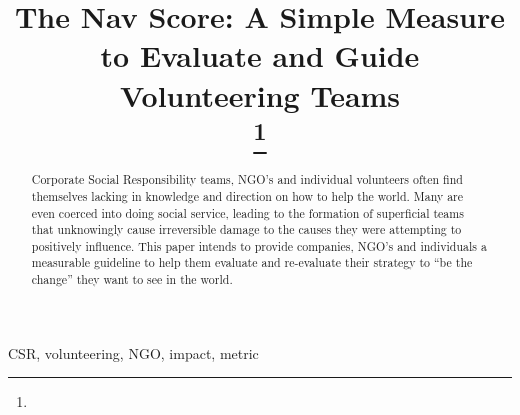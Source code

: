 \documentclass[conference]{IEEEtran}
\begin{document}
\title{The Nav Score: A Simple Measure to Evaluate and Guide Volunteering Teams\\
{\footnotesize }
\thanks{}
}

\author{
}

\maketitle

\begin{abstract}
Corporate Social Responsibility teams, NGO's and individual volunteers often find themselves lacking in knowledge and direction on how to help the world. Many are even coerced into doing social service, leading to the formation of superficial teams that unknowingly cause irreversible damage to the causes they were attempting to positively influence. This paper intends to provide companies, NGO's and individuals a measurable guideline to help them evaluate and re-evaluate their strategy to \enquote{be the change} they want to see in the world.

\end{abstract}

\begin{IEEEkeywords}
CSR, volunteering, NGO, impact, metric
\end{IEEEkeywords}
\end{document}
